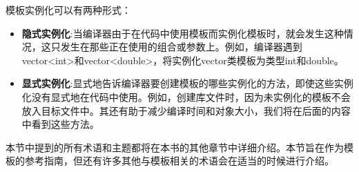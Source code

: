 模板实例化可以有两种形式：

\begin{itemize}
\item
\textbf{隐式实例化}:当编译器由于在代码中使用模板而实例化模板时，就会发生这种情况，这只发生在那些正在使用的组合或参数上。例如，编译器遇到vector<int>和vector<double>，将实例化vector类模板为类型int和double。

\item
\textbf{显式实例化}:显式地告诉编译器要创建模板的哪些实例化的方法，即使这些实例化没有显式地在代码中使用。例如，创建库文件时，因为未实例化的模板不会放入目标文件中。其还有助于减少编译时间和对象大小，我们将在后面的内容中看到这些方法。
\end{itemize}

本节中提到的所有术语和主题都将在本书的其他章节中详细介绍。本节旨在作为模板的参考指南，但还有许多其他与模板相关的术语会在适当的时候进行介绍。




